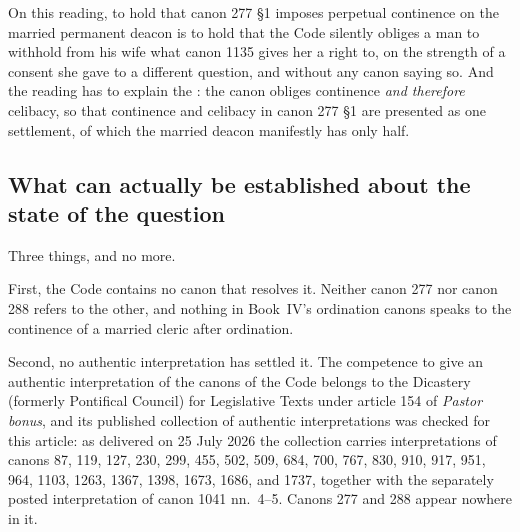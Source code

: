 On this reading, to hold that canon 277 §1 imposes perpetual continence on the married permanent deacon is to hold that the Code silently obliges a man to withhold from his wife what canon 1135 gives her a right to, on the strength of a consent she gave to a different question, and without any canon saying so. And the reading has to explain the : the canon obliges continence \emph{and therefore} celibacy, so that continence and celibacy in canon 277 §1 are presented as one settlement, of which the married deacon manifestly has only half.

\subsection{What can actually be established about the state of the question}

Three things, and no more.

First, the Code contains no canon that resolves it. Neither canon 277 nor canon 288 refers to the other, and nothing in Book~IV's ordination canons speaks to the continence of a married cleric after ordination.

Second, no authentic interpretation has settled it. The competence to give an authentic interpretation of the canons of the Code belongs to the Dicastery (formerly Pontifical Council) for Legislative Texts under article 154 of \emph{Pastor bonus}, and its published collection of authentic interpretations was checked for this article: as delivered on 25 July 2026 the collection carries interpretations of canons 87, 119, 127, 230, 299, 455, 502, 509, 684, 700, 767, 830, 910, 917, 951, 964, 1103, 1263, 1367, 1398, 1673, 1686, and 1737, together with the separately posted interpretation of canon 1041 nn.~4--5. Canons 277 and 288 appear nowhere in it.

